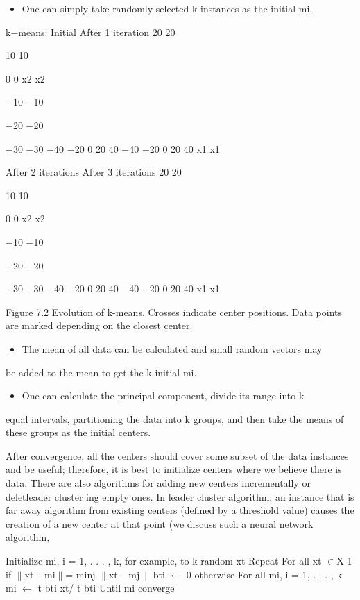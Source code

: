 \begin{itemize}
\item One can simply take randomly selected k instances as the initial mi.
\end{itemize}

k$-$means: Initial After 1 iteration 20 20

10 10

0 0 x2 x2

$-$10 $-$10

$-$20 $-$20

$-$30 $-$30 $-$40 $-$20 0 20 40 $-$40 $-$20 0 20 40 x1 x1

After 2 iterations After 3 iterations 20 20

10 10

0 0 x2 x2

$-$10 $-$10

$-$20 $-$20

$-$30 $-$30 $-$40 $-$20 0 20 40 $-$40 $-$20 0 20 40 x1 x1

Figure 7.2 Evolution of k-means. Crosses indicate center positions. Data points are marked depending on the closest center.

\begin{itemize}
\item The mean of all data can be calculated and small random vectors may
\end{itemize}

be added to the mean to get the k initial mi.

\begin{itemize}
\item One can calculate the principal component, divide its range into k
\end{itemize}

equal intervals, partitioning the data into k groups, and then take the means of these groups as the initial centers.

After convergence, all the centers should cover some subset of the data instances and be useful; therefore, it is best to initialize centers where we believe there is data. There are also algorithms for adding new centers incrementally or deletleader cluster ing empty ones. In leader cluster algorithm, an instance that is far away algorithm from existing centers (defined by a threshold value) causes the creation of a new center at that point (we discuss such a neural network algorithm,

Initialize mi, i = 1, . . . , k, for example, to k random xt Repeat For all xt $\in$X 1 if $\parallel$xt $-$mi$\parallel$= minj $\parallel$xt $-$mj$\parallel$ bti $\leftarrow$ 0 otherwise For all mi, i = 1, . . . , k mi $\leftarrow$ t bti xt/ t bti Until mi converge

